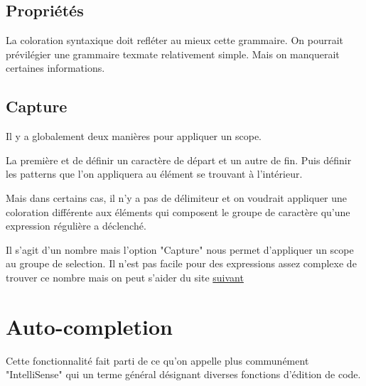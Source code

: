 \documentclass[
    iict, %
    il, %
]{heig-tb}
\begin{document}
\subsection{Propriétés}

La coloration syntaxique doit refléter au mieux cette grammaire. On pourrait prévilégier une grammaire texmate relativement simple. Mais on manquerait certaines informations.




\subsection{Capture}

Il y a globalement deux manières pour appliquer un scope.

La première et de définir un caractère de départ et un autre de fin. Puis définir les patterns que l'on appliquera au élément se trouvant à l'intérieur.


Mais dans certains cas, il n'y a pas de délimiteur et on voudrait appliquer une coloration différente aux éléments qui composent le groupe de caractère qu'une expression régulière
a déclenché.


Il s'agit d'un nombre mais l'option "Capture" nous permet d'appliquer un scope au groupe de selection.
Il n'est pas facile pour des expressions assez complexe de trouver ce nombre mais on peut s'aider du site \href{https://regex101.com/}{suivant}



\section{Auto-completion}

Cette fonctionnalité fait parti de ce qu'on appelle plus communément "IntelliSense" \cite{intelliSense} qui un terme général désignant diverses fonctions d'édition de code.
\end{document}
